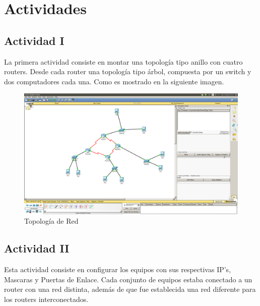 \documentclass[spanish]{udpreport}
\begin{document}
\chapter{Actividades}

\section{Actividad I}

La primera actividad consiste en montar una topología tipo anillo con cuatro routers. Desde cada router una topología tipo árbol, compuesta por un switch y dos computadores cada una. Como es mostrado en la siguiente imagen.

\begin{figure}[H]
	\centering
	\includegraphics[scale=.25]{imagenes/red.png}
	\caption{Topología de Red}
	\label{fig:Figura 2.1}
\end{figure}

\pagebreak 

\section{Actividad II}

Esta actividad consiste en configurar los equipos con sus respectivas IP's, Mascaras y Puertas de Enlace. Cada conjunto de equipos estaba conectado a un router con una red distinta, además de que fue establecida una red diferente para los routers interconectados.
\end{document}
